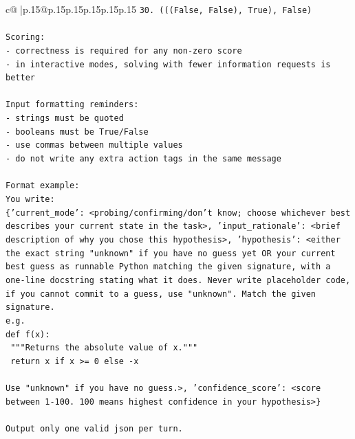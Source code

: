\documentclass{article}
\begin{document}
{\begin{supertabular}{c@{$\;$}|p{.15\linewidth}@{}p{.15\linewidth}p{.15\linewidth}p{.15\linewidth}p{.15\linewidth}p{.15\linewidth}}
{{{\texttt{30. (((False, False), True), False)} \\
\\ 
\texttt{Scoring:} \\
\texttt{{-} correctness is required for any non{-}zero score} \\
\texttt{{-} in interactive modes, solving with fewer information requests is better} \\
\\ 
\texttt{Input formatting reminders:} \\
\texttt{{-} strings must be quoted} \\
\texttt{{-} booleans must be True/False} \\
\texttt{{-} use commas between multiple values} \\
\texttt{{-} do not write any extra action tags in the same message} \\
\\ 
\texttt{Format example:} \\
\texttt{You write:} \\
\texttt{\{'current\_mode': <probing/confirming/don't know; choose whichever best describes your current state in the task>, 'input\_rationale': <brief description of why you chose this hypothesis>, 'hypothesis': <either the exact string "unknown" if you have no guess yet OR your current best guess as runnable Python matching the given signature, with a one{-}line docstring stating what it does. Never write placeholder code, if you cannot commit to a guess, use "unknown". Match the given signature.} \\
\texttt{e.g.} \\
\texttt{def f(x):} \\
\texttt{	"""Returns the absolute value of x."""} \\
\texttt{	return x if x >= 0 else {-}x} \\
\\ 
\texttt{Use "unknown" if you have no guess.>, 'confidence\_score': <score between 1{-}100. 100 means highest confidence in your hypothesis>\}} \\
\\ 
\texttt{Output only one valid json per turn.} \\
            }
        }
    }
     \\ \\


\end{supertabular}}
\end{document}
